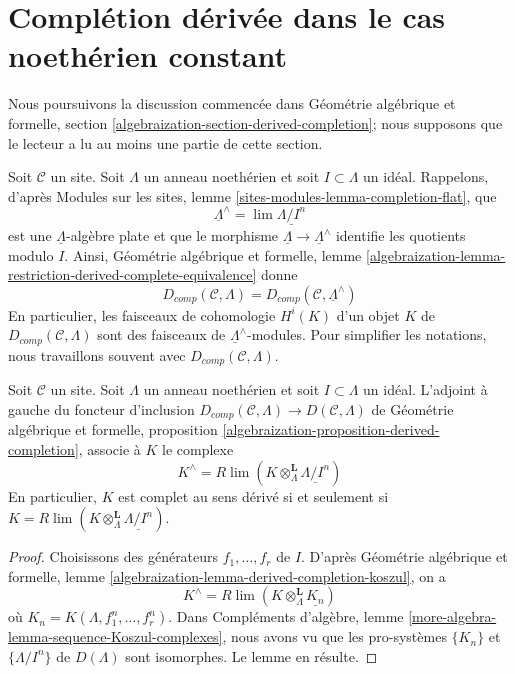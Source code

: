 \section{Complétion dérivée dans le cas noethérien constant}
\label{section-derived-completion-noetherian}

\noindent
Nous poursuivons la discussion commencée dans Géométrie algébrique et formelle, section
\ref{algebraization-section-derived-completion};
nous supposons que le lecteur a lu au moins une partie de cette section.

\medskip\noindent
Soit $\mathcal{C}$ un site. Soit $\Lambda$ un anneau noethérien
et soit $I \subset \Lambda$ un idéal. Rappelons, d'après
Modules sur les sites, lemme \ref{sites-modules-lemma-completion-flat},
que
$$
\underline{\Lambda}^\wedge = \lim \underline{\Lambda/I^n}
$$
est une $\underline{\Lambda}$-algèbre plate et que le morphisme
$\underline{\Lambda} \to \underline{\Lambda}^\wedge$ identifie
les quotients modulo $I$. Ainsi,
Géométrie algébrique et formelle, lemme
\ref{algebraization-lemma-restriction-derived-complete-equivalence}
donne
$$
D_{comp}(\mathcal{C}, \Lambda) =
D_{comp}(\mathcal{C}, \underline{\Lambda}^\wedge)
$$
En particulier, les faisceaux de cohomologie $H^i(K)$ d'un objet $K$ de
$D_{comp}(\mathcal{C}, \Lambda)$ sont des faisceaux de
$\underline{\Lambda}^\wedge$-modules.
Pour simplifier les notations, nous travaillons souvent avec
$D_{comp}(\mathcal{C}, \Lambda)$.

\begin{lemma}
\label{lemma-naive-completion}
Soit $\mathcal{C}$ un site. Soit $\Lambda$ un anneau noethérien
et soit $I \subset \Lambda$ un idéal. L'adjoint à gauche
du foncteur d'inclusion
$D_{comp}(\mathcal{C}, \Lambda) \to D(\mathcal{C}, \Lambda)$
de Géométrie algébrique et formelle, proposition
\ref{algebraization-proposition-derived-completion}, associe à $K$ le complexe
$$
K^\wedge = R\lim(K \otimes_\Lambda^\mathbf{L} \underline{\Lambda/I^n})
$$
En particulier, $K$ est complet au sens dérivé si et seulement si
$K = R\lim(K \otimes_\Lambda^\mathbf{L} \underline{\Lambda/I^n})$.
\end{lemma}

\begin{proof}
Choisissons des générateurs $f_1, \ldots, f_r$ de $I$. D'après
Géométrie algébrique et formelle, lemme
\ref{algebraization-lemma-derived-completion-koszul},
on a
$$
K^\wedge = 
R\lim (K \otimes_\Lambda^\mathbf{L} \underline{K_n})
$$
où $K_n = K(\Lambda, f_1^n, \ldots, f_r^n)$.
Dans Compléments d'algèbre, lemme \ref{more-algebra-lemma-sequence-Koszul-complexes},
nous avons vu que les pro-systèmes $\{K_n\}$ et
$\{\Lambda/I^n\}$ de $D(\Lambda)$
sont isomorphes. Le lemme en résulte.
\end{proof}

